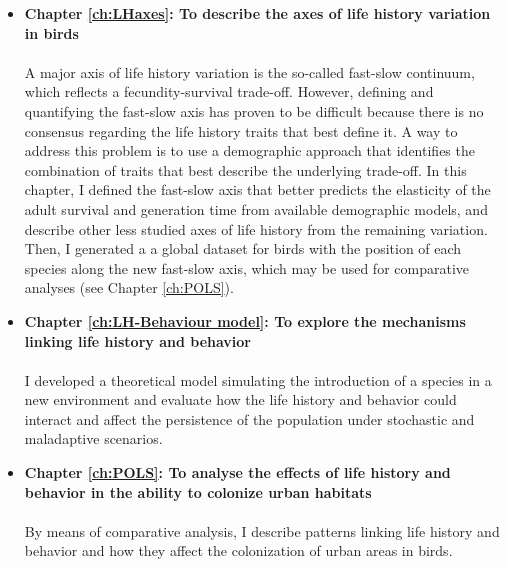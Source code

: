 \begin{itemize}
\item \textbf{Chapter \ref{ch:LHaxes}: To describe the axes of life history 
variation in birds}\\ \\

A major axis of life history variation is the so-called fast-slow continuum, 
which reflects a fecundity-survival trade-off. However, defining and 
quantifying the fast-slow axis has proven to be difficult because there is no 
consensus regarding the life history traits that best define it. A way to 
address this problem is to use a demographic approach that identifies the 
combination of traits that best describe the underlying trade-off. 
In this chapter, I defined the fast-slow axis that better predicts the 
elasticity of the adult survival and generation time from available demographic 
models, and describe other less studied axes of life history from the remaining 
variation. Then, I generated a a global dataset for birds with the position of 
each species along the new fast-slow axis, which may be used for comparative 
analyses (see Chapter \ref{ch:POLS}).

\item \textbf{Chapter \ref{ch:LH-Behaviour model}: To explore the mechanisms 
linking life history and behavior}\\ \\

I developed a theoretical model simulating the introduction of a species in a 
new environment and evaluate how the life history and behavior could interact 
and affect the persistence of the population under stochastic and maladaptive 
scenarios.

\item \textbf{Chapter \ref{ch:POLS}: To analyse the effects of life history and 
behavior in the ability to colonize urban habitats}\\ \\
By means of comparative analysis, I describe patterns linking life history and 
behavior and how they affect the colonization of urban areas in birds.
\end{itemize}
